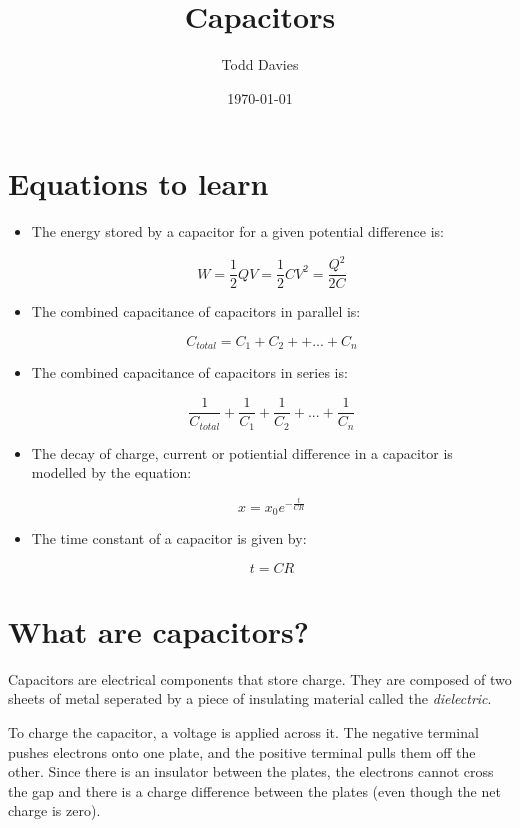 \documentclass{article}
\title{Capacitors}
\author{Todd Davies}
\date{\today}
\begin{document}
\lhead{\today}

\maketitle

\section*{Equations to learn}
\thispagestyle{empty}

\begin{itemize}
	
	\item The energy stored by a capacitor for a given potential difference is:
	
	\[
		W = \frac{1}{2}QV = \frac{1}{2}CV^2 = \frac{Q^2}{2C}
	\]

	\item The combined capacitance of capacitors in parallel is:

	\[
		C_{total} = C_1 + C_2 + +... + C_n
	\]

	\item The combined capacitance of capacitors in series is:
	
	\[
		\frac{1}{C_{total}} + \frac{1}{C_1} + \frac{1}{C_2} + ... + \frac{1}{C_n}
	\]

	\item The decay of charge, current or potiential difference in a capacitor
	is modelled by the equation:

	\[
		x = x_0 e^{-\frac{t}{CR}}
	\]

	\item The time constant of a capacitor is given by:

	\[
		t = CR
	\]

\end{itemize}


\section*{What are capacitors?}

Capacitors are electrical components that store charge. They are composed of two
sheets of metal seperated by a piece of insulating material called the {\it
dielectric}.

To charge the capacitor, a voltage is applied across it. The negative terminal
pushes electrons onto one plate, and the positive terminal pulls them off the
other. Since there is an insulator between the plates, the electrons cannot
cross the gap and there is a charge difference between the plates (even though
the net charge is zero).
\end{document}
